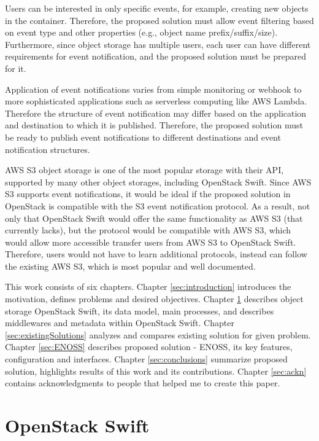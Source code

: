 \documentclass{ExcelAtFIT}
\begin{document}
Users can be interested in only specific events, for example, creating new objects in the container. Therefore, the proposed solution must allow event filtering based on event type and other properties (e.g., object name prefix/suffix/size). Furthermore, since object storage has multiple users, each user can have different requirements for event notification, and the proposed solution must be prepared for it.

Application of event notifications varies from simple monitoring or webhook to more sophisticated applications such as serverless computing like AWS Lambda. Therefore the structure of event notification may differ based on the application and destination to which it is published. Therefore, the proposed solution must be ready to publish event notifications to different destinations and event notification structures.

AWS S3 object storage is one of the most popular storage with their API, supported by many other object storages, including OpenStack Swift. Since AWS S3 supports event notifications, it would be ideal if the proposed solution in OpenStack is compatible with the S3 event notification protocol. As a result, not only that OpenStack Swift would offer the same functionality as AWS S3 (that currently lacks), but the protocol would be compatible with AWS S3, which would allow more accessible transfer users from AWS S3 to OpenStack Swift. Therefore, users would not have to learn additional protocols, instead can follow the existing AWS S3, which is most popular and well documented.

This work consists of six chapters. Chapter \ref{sec:introduction} introduces the motivation, defines problems and desired objectives. Chapter \ref{sec:swift} describes object storage OpenStack Swift, its data model, main processes, and describes middlewares and metadata within OpenStack Swift. Chapter \ref{sec:existingSolutions} analyzes and compares existing solution for given problem. Chapter \ref{sec:ENOSS} describes proposed solution - ENOSS, its key features, configuration and interfaces. Chapter \ref{sec:conclusions} summarize proposed solution, highlights results of this work and its contributions. Chapter \ref{sec:ackn} contains acknowledgments to people that helped me to create this paper.

\section{OpenStack Swift}\label{sec:swift}
\end{document}
